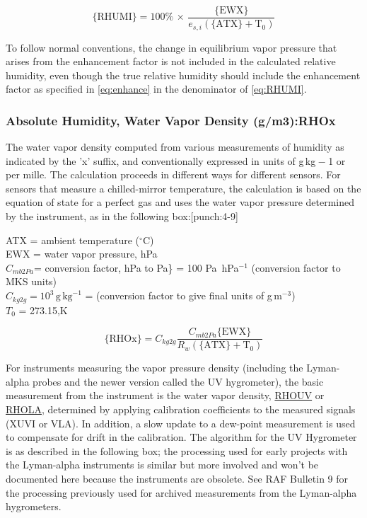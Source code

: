 \documentclass[
  english,
]{book}
\begin{document}
\begin{equation}
\mathrm{\{RHUMI\}}=100\%\,\times\,\frac{\mathrm{\{EWX\}}}{e_{s,i}(\mathrm{\{ATX\}+T_{0}})}
\label{eq:RHUMI}
\end{equation}

To follow normal conventions, the change in equilibrium vapor pressure that arises from the enhancement factor is not included in the calculated relative humidity, even though the true relative humidity should include the enhancement factor as specified in \eqref{eq:enhance} in the denominator of \eqref{eq:RHUMI}.

\hypertarget{rho}{%
\subsubsection*{\texorpdfstring{Absolute Humidity, Water Vapor Density (g/m{3}):RHOx}{Absolute Humidity, Water Vapor Density (g/m3):RHOx}}\label{rho}}

The water vapor density computed from various measurements of humidity as indicated by the 'x' suffix, and conventionally expressed in units of g kg{ − 1} or per mille. The calculation proceeds in different ways for different sensors. For sensors that measure a chilled-mirror temperature, the calculation is based on the equation of state for a perfect gas and uses the water vapor pressure determined by the instrument, as in the following box:\protect\hypertarget{punch:4-9}{}{{[}punch:4-9{]}}

ATX = ambient temperature (\(^{\circ}\mathrm{C}\))\\
EWX = water vapor pressure, hPa\\
\(C_{mb2Pa}\)= conversion factor, hPa to Pa\} = 100 Pa~hPa\(^{-1}\) (conversion factor to MKS units)\\
\(C_{kg2g}=10^{3}\,\mathrm{g\,kg}^{-1}\) = (conversion
factor to give final units of g\(\,\)m\(^{-3}\))\\
\(T_{0}\) = 273.15,K

\begin{equation}
\mathrm{\{RHOx\}} = C_{kg2g}\frac{C_{mb2Pa}\mathrm{\{EWX\}}}{R_{w}\mathrm{(\{ATX\}+T_{0})}}
\label{eq:RHOx}
\end{equation}

For instruments measuring the vapor pressure density (including the Lyman-alpha probes and the newer version called the UV hygrometer), the basic measurement from the instrument is the water vapor density, \underline{RHOUV} or \underline{RHOLA}, determined by applying calibration coefficients to the measured signals (XUVI or VLA). In addition, a slow update to a dew-point measurement is used to compensate for drift in the calibration. The algorithm for the UV Hygrometer is as described in the following box; the processing used for early projects with the Lyman-alpha instruments is similar but more involved and won't be documented here because the instruments are obsolete. See RAF Bulletin 9 for the processing previously used for archived measurements from the Lyman-alpha hygrometers.\\
\end{document}

